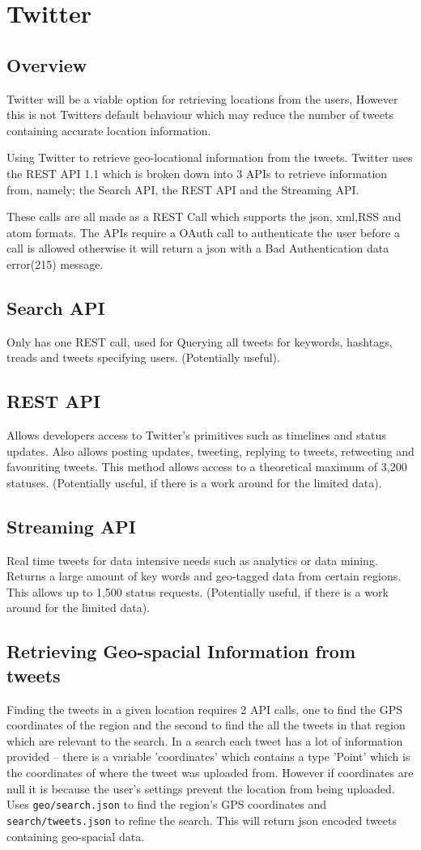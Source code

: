 \documentclass{article}
\begin{document}
\section{Twitter}
\subsection{Overview}
Twitter will be a viable option for retrieving locations from the users, However this is not Twitters default behaviour which may reduce the number of tweets containing accurate location information.

Using Twitter to retrieve geo-locational information from the tweets. Twitter uses the REST API 1.1 which is broken down into 3 APIs to retrieve information from, namely; the Search API, the REST API and the Streaming API.

These calls are all made as a REST Call which supports the json, xml,RSS and atom formats. The APIs require a OAuth call to authenticate the user before a call is allowed otherwise it will return a json with a Bad Authentication data error(215) message.
\subsection{Search API}
Only has one REST call, used for Querying all tweets for keywords, hashtags, treads and tweets specifying users. (Potentially useful).
\subsection{REST API}
Allows developers access to Twitter's primitives such as timelines and status updates. Also allows posting updates, tweeting, replying to tweets, retweeting and favouriting tweets. This method allows access to a theoretical maximum of 3,200 statuses. (Potentially useful, if there is a work around for the limited data).
\subsection{Streaming API}
Real time tweets for data intensive needs such as analytics or data mining. Returns a large amount of key words and geo-tagged data from certain regions. This allows up to 1,500 status requests. (Potentially useful, if there is a work around for the limited data).
\subsection{Retrieving Geo-spacial Information from tweets}
Finding the tweets in a given location requires 2 API calls, one to find the GPS coordinates of the region and the second to find the all the tweets in that region which are relevant to the search. In a search each tweet has a lot of information provided -- there is a variable 'coordinates' which contains a type 'Point' which is the coordinates of where the tweet was uploaded from. However if coordinates are null it is because the user's settings prevent the location from being uploaded.
Uses \verb+geo/search.json+ to find the region's GPS coordinates and \verb+search/tweets.json+ to refine the search. This will return json encoded tweets containing geo-spacial data.
\end{document}
